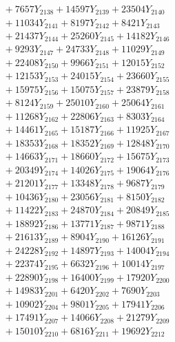 \documentclass[a4paper,10pt]{article}
\begin{document}
{\begin{align}
&\;  + 7657 Y_{2138} + 14597 Y_{2139} + 23504 Y_{2140} \\[0.3ex]
&\;  + 11034 Y_{2141} + 8197 Y_{2142} + 8421 Y_{2143} \\[0.3ex]
&\;  + 21437 Y_{2144} + 25260 Y_{2145} + 14182 Y_{2146} \\[0.3ex]
&\;  + 9293 Y_{2147} + 24733 Y_{2148} + 11029 Y_{2149} \\[0.3ex]
&\;  + 22408 Y_{2150} + 9966 Y_{2151} + 12015 Y_{2152} \\[0.3ex]
&\;  + 12153 Y_{2153} + 24015 Y_{2154} + 23660 Y_{2155} \\[0.3ex]
&\;  + 15975 Y_{2156} + 15075 Y_{2157} + 23879 Y_{2158} \\[0.5ex]\allowbreak
&\;  + 8124 Y_{2159} + 25010 Y_{2160} + 25064 Y_{2161} \\[0.3ex]
&\;  + 11268 Y_{2162} + 22806 Y_{2163} + 8303 Y_{2164} \\[0.3ex]
&\;  + 14461 Y_{2165} + 15187 Y_{2166} + 11925 Y_{2167} \\[0.3ex]
&\;  + 18353 Y_{2168} + 18352 Y_{2169} + 12848 Y_{2170} \\[0.3ex]
&\;  + 14663 Y_{2171} + 18660 Y_{2172} + 15675 Y_{2173} \\[0.3ex]
&\;  + 20349 Y_{2174} + 14026 Y_{2175} + 19064 Y_{2176} \\[0.3ex]
&\;  + 21201 Y_{2177} + 13348 Y_{2178} + 9687 Y_{2179} \\[0.3ex]
&\;  + 10436 Y_{2180} + 23056 Y_{2181} + 8150 Y_{2182} \\[0.3ex]
&\;  + 11422 Y_{2183} + 24870 Y_{2184} + 20849 Y_{2185} \\[0.3ex]
&\;  + 18892 Y_{2186} + 13771 Y_{2187} + 9871 Y_{2188} \\[0.5ex]\allowbreak
&\;  + 21613 Y_{2189} + 8904 Y_{2190} + 16126 Y_{2191} \\[0.3ex]
&\;  + 24228 Y_{2192} + 14897 Y_{2193} + 14004 Y_{2194} \\[0.3ex]
&\;  + 22374 Y_{2195} + 6632 Y_{2196} + 10014 Y_{2197} \\[0.3ex]
&\;  + 22890 Y_{2198} + 16400 Y_{2199} + 17920 Y_{2200} \\[0.3ex]
&\;  + 14983 Y_{2201} + 6420 Y_{2202} + 7690 Y_{2203} \\[0.3ex]
&\;  + 10902 Y_{2204} + 9801 Y_{2205} + 17941 Y_{2206} \\[0.3ex]
&\;  + 17491 Y_{2207} + 14066 Y_{2208} + 21279 Y_{2209} \\[0.3ex]
&\;  + 15010 Y_{2210} + 6816 Y_{2211} + 19692 Y_{2212} \\[0.3ex]

\end{align}}
\end{document}
